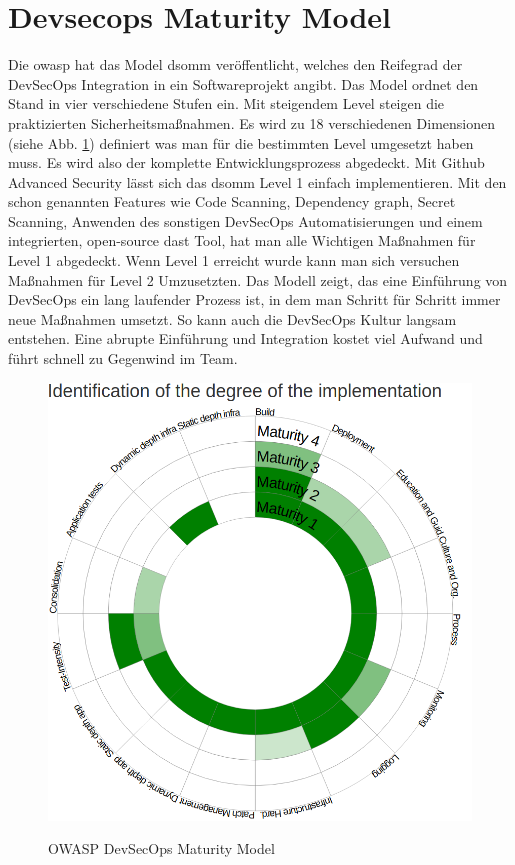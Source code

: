 \section{Devsecops Maturity Model}
Die \ac{owasp} hat das Model \ac{dsomm} veröffentlicht, welches den Reifegrad der DevSecOps Integration in ein Softwareprojekt angibt. Das Model ordnet den Stand in vier verschiedene Stufen ein. Mit steigendem Level steigen die praktizierten Sicherheitsmaßnahmen. Es wird zu 18 verschiedenen Dimensionen (siehe Abb. \ref{FIG:dsomm-levels}) definiert was man für die bestimmten Level umgesetzt haben muss. Es wird also der komplette Entwicklungsprozess abgedeckt. \cite{owasp-dsomm} Mit Github Advanced Security lässt sich das \ac{dsomm} Level 1 einfach implementieren. Mit den schon genannten Features wie Code Scanning, Dependency graph, Secret Scanning, Anwenden des sonstigen DevSecOps Automatisierungen und einem integrierten, open-source \ac{dast} Tool, hat man alle Wichtigen Maßnahmen für Level 1 abgedeckt. Wenn Level 1 erreicht wurde kann man sich versuchen Maßnahmen für Level 2 Umzusetzten. \cite{Alwell2020-ar} Das Modell zeigt, das eine Einführung von DevSecOps ein lang laufender Prozess ist, in dem man Schritt für Schritt immer neue Maßnahmen umsetzt. So kann auch die DevSecOps Kultur langsam entstehen. Eine abrupte Einführung und Integration kostet viel Aufwand und führt schnell zu Gegenwind im Team.
\begin{figure}[H]
	{\caption{OWASP DevSecOps Maturity Model}
		\label{FIG:dsomm-levels}}
	{\includegraphics[width=1\textwidth]{figures/DSOMM.png}}
\end{figure}

